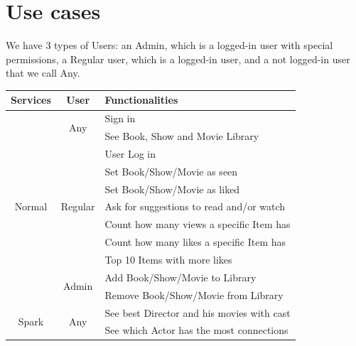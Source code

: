 \documentclass{article}
\newcommand*\fpar{\hspace{1ex}}
\begin{document}
\section{Use cases}
\label{sec:cases}
\fpar We have 3 types of Users: an Admin, which is a logged-in user with special permissions, a Regular user, which is a logged-in user, and a not logged-in user that we call Any.
\begin{table}[H]
  \centering
  \begin{tabular}{c|c|l} 
    Services & User & Functionalities \\ \hline
    \multirow{11}{*}{ Normal }
      & \multirow{2}{*}{ Any } 
        & Sign in \\
      & & See Book, Show and Movie Library \\ \cline{2-3}
      & \multirow{7}{*}{ Regular } 
        & User Log in \\
      & & Set Book/Show/Movie as seen \\
      & & Set Book/Show/Movie as liked \\ 
      & & Ask for suggestions to read and/or watch \\ 
      & & Count how many views a specific Item has \\
      & & Count how many likes a specific Item has \\
      & & Top 10 Items with more likes \\ \cline{2-3}
    & \multirow{2}{*}{ Admin } 
        & Add Book/Show/Movie to Library \\
      & & Remove Book/Show/Movie from Library \\ \hline
    \multirow{2}{*}{ Spark }
      & \multirow{2}{*}{ Any }
        & See best Director and his movies with cast \\
      & & See which Actor has the most connections \\
  \end{tabular}
\end{table}
\end{document}
